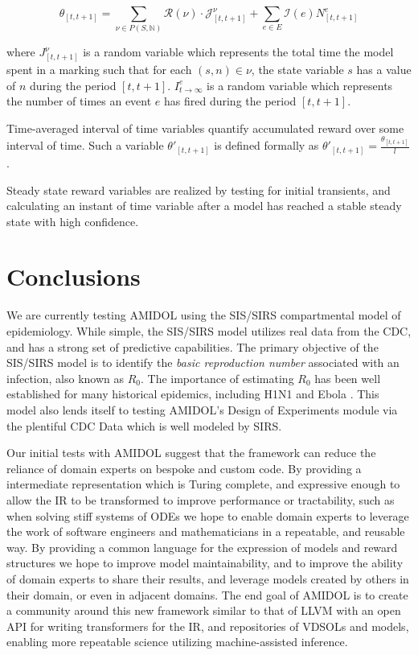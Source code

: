 \documentclass[11pt]{article}
\newcommand{\amidol}{\textsc{AMIDOL}}
\begin{document}
\[\theta_{[t,t+1]} = \sum_{\nu \in P(S, \mathbb{N})} \mathcal{R}(\nu) \cdot \mathcal{J}^{\nu}_{[t, t+1]} + \sum_{e \in E} \mathcal{I}(e)N^e_{[t,t+1]}\]

where $J^{\nu}_{[t,t+1]}$ is a random variable which represents the total time the model spent in a marking such that for each $(s, n) \in \nu$, the state variable $s$ has a value of $n$ during the period $[t, t+1]$. $I^e_{t\rightarrow\infty}$ is a random variable which represents the number of times an event $e$ has fired during the period $[t, t+1]$.

Time-averaged interval of time variables quantify accumulated reward over some interval of time.  Such a variable $\theta'_{[t,t+1]}$ is defined formally as $\theta'_{[t,t+1]} = \frac{\theta_{[t,t+1]}}{l}$.

Steady state reward variables are realized by testing for initial transients, and calculating an instant of time variable after a model has reached a stable steady state with high confidence.

\section{Conclusions}

We are currently testing \amidol{} using the SIS/SIRS compartmental model of epidemiology.  While simple, the SIS/SIRS model utilizes real data from the CDC, and has a strong set of predictive capabilities.  The primary objective of the SIS/SIRS model is to identify the \emph{basic reproduction number} associated with an infection, also known as $R_0$. The importance of estimating $R_0$ has been well established for many historical epidemics, including H1N1 \cite{fraser2009pandemic} and Ebola \cite{fisman2014early}.  This model also lends itself to testing \amidol{}'s Design of Experiments module via the plentiful CDC Data \cite{cdc2019fluview} which is well modeled by SIRS.

Our initial tests with \amidol{} suggest that the framework can reduce the reliance of domain experts on bespoke and custom code.  By providing a intermediate representation which is Turing complete, and expressive enough to allow the IR to be transformed to improve performance or tractability, such as when solving stiff systems of ODEs \cite{enright1975comparing} we hope to enable domain experts to leverage the work of software engineers and mathematicians in a repeatable, and reusable way.  By providing a common language for the expression of models and reward structures we hope to improve model maintainability, and to improve the ability of domain experts to share their results, and leverage models created by others in their domain, or even in adjacent domains.  The end goal of \amidol{} is to create a community around this new framework similar to that of LLVM \cite{lattner2004llvm} with an open API for writing transformers for the IR, and repositories of VDSOLs and models, enabling more repeatable science utilizing machine-assisted inference.
\end{document}
